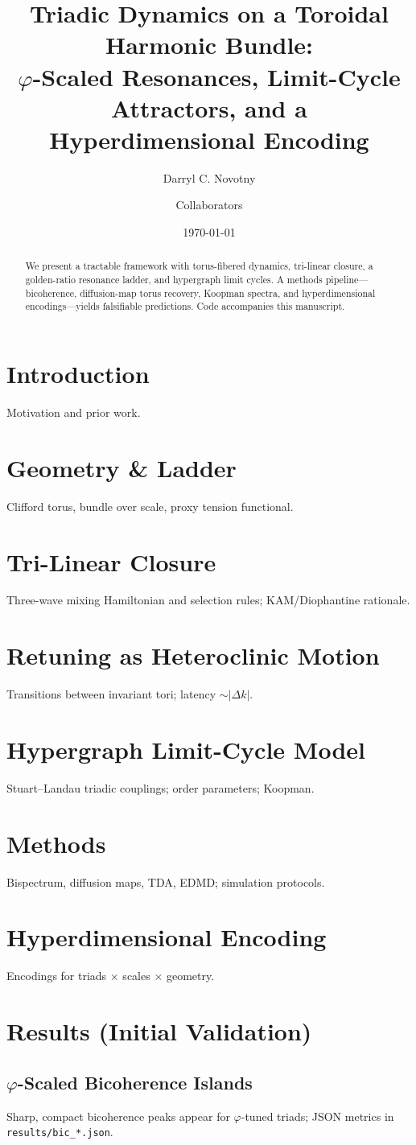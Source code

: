 \documentclass[11pt]{article}
\title{Triadic Dynamics on a Toroidal Harmonic Bundle:\\ \large $\varphi$-Scaled Resonances, Limit-Cycle Attractors, and a Hyperdimensional Encoding}
\author{Darryl C. Novotny \and Collaborators}
\date{\today}
\begin{document}
\maketitle
\begin{abstract}
We present a tractable framework with torus-fibered dynamics, tri-linear closure, a golden-ratio resonance ladder, and hypergraph limit cycles. A methods pipeline---bicoherence, diffusion-map torus recovery, Koopman spectra, and hyperdimensional encodings---yields falsifiable predictions. Code accompanies this manuscript.
\end{abstract}
\section{Introduction} Motivation and prior work.
\section{Geometry \& Ladder} Clifford torus, bundle over scale, proxy tension functional.
\section{Tri-Linear Closure} Three-wave mixing Hamiltonian and selection rules; KAM/Diophantine rationale.
\section{Retuning as Heteroclinic Motion} Transitions between invariant tori; latency $\sim |\Delta k|$.
\section{Hypergraph Limit-Cycle Model} Stuart--Landau triadic couplings; order parameters; Koopman.
\section{Methods} Bispectrum, diffusion maps, TDA, EDMD; simulation protocols.
\section{Hyperdimensional Encoding} Encodings for triads $\times$ scales $\times$ geometry.
\section{Results (Initial Validation)}
\subsection{$\varphi$-Scaled Bicoherence Islands}
Sharp, compact bicoherence peaks appear for $\varphi$-tuned triads; JSON metrics in \texttt{results/bic\_*.json}.
\end{document}
